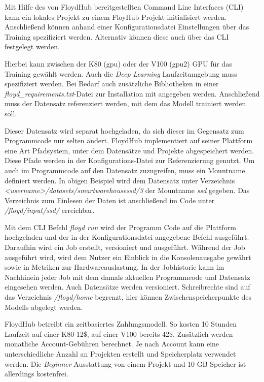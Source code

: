 Mit Hilfe des von FloydHub bereitgestellten Command Line Interfaces (CLI) kann ein lokales Projekt zu einem FloyHub Projekt initialisiert werden. Anschließend können anhand einer Konfigurationsdatei Einstellungen über das Training spezifiziert werden. Alternativ können diese auch über das CLI festgelegt werden. 

\lstset{language=XML}


Hierbei kann zwischen der K80 (gpu) oder der V100 (gpu2) GPU für das Training gewählt werden. Auch die \textit{Deep Learning} Laufzeitumgebung muss spezifiziert werden. Bei Bedarf auch zusätzliche Bibliotheken in einer \textit{floyd\_requirements.txt}-Datei zur Installation mit angegeben werden. Anschließend muss der Datensatz referenziert werden, mit dem das Modell trainiert werden soll. 

Dieser Datensatz wird separat hochgeladen, da sich dieser im Gegensatz zum Programmcode nur selten ändert. FloydHub implementiert auf seiner Plattform eine Art Pfadsystem, unter dem Datensätze und Projekte abgespeichert werden. Diese Pfade werden in der Konfigurations-Datei zur Referenzierung genutzt. Um auch im Programmcode auf den Datensatz zuzugreifen, muss ein Mountname definiert werden. In obigen Beispiel wird dem Datensatz unter Verzeichnis \textit{<username>/datasets/smartwarehousessd/3} der Mountname \textit{ssd} gegeben. Das Verzeichnis zum Einlesen der Daten ist anschließend im Code unter \textit{/floyd/input/ssd/} erreichbar. 

Mit dem CLI Befehl \textit{floyd run} wird der Programm Code auf die Plattform hochgeladen und der in der Konfigurationsdatei angegebene Befehl ausgeführt. Daraufhin wird ein Job erstellt, versioniert und ausgeführt. Während der Job ausgeführt wird, wird dem Nutzer ein Einblick in die Konsolenausgabe gewährt sowie in Metriken zur Hardwareauslastung. In der Jobhistorie kann im Nachhinein jeder Job mit dem damals aktuellen Programmcode und Datensatz eingesehen werden. Auch Datensätze werden versioniert. Schreibrechte sind auf das Verzeichnis \textit{/floyd/home} begrenzt, hier können Zwischenspeicherpunkte des Modells abgelegt werden. 

FloydHub betreibt ein zeitbasiertes Zahlungsmodell. So kosten 10 Stunden Laufzeit auf einer K80 12\$, auf einer V100 bereits 42\$. Zusätzlich werden monatliche Account-Gebühren berechnet. Je nach Account kann eine unterschiedliche Anzahl an Projekten erstellt und Speicherplatz verwendet werden. Die \textit{Beginner} Ausstattung von einem Projekt und 10 GB Speicher ist allerdings kostenfrei. 

